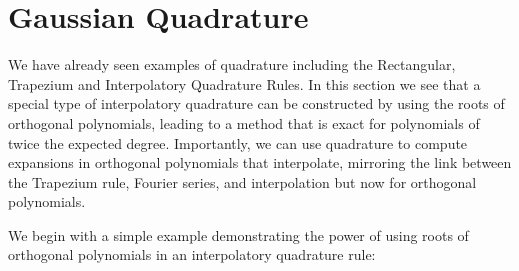 
\section{Gaussian Quadrature}
We have already seen examples of quadrature including the Rectangular, Trapezium and Interpolatory Quadrature Rules. In this section we see that a special type of interpolatory quadrature can be constructed by using the roots of orthogonal polynomials, leading to a method that is exact for polynomials of twice the expected degree. Importantly, we can use quadrature to compute expansions in orthogonal polynomials that interpolate,  mirroring the link between the Trapezium rule, Fourier series, and interpolation but now for orthogonal polynomials.

We begin with a simple example demonstrating the power of using roots of orthogonal polynomials in an interpolatory quadrature rule:

